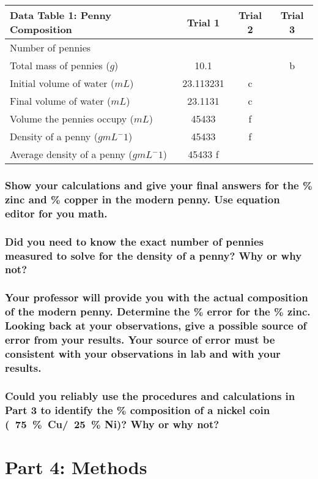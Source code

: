 \documentclass[a4paper,10pt]{article}
\begin{document}
        \begin{table}[h!]
            \label{tab:table1}
            \begin{tabular}{|l|c|c|c|}
                \hline
                \textbf{Data Table 1: Penny Composition} & \textbf{Trial 1} & \textbf{Trial 2} & \textbf{Trial 3}\\
                \hline
                Number of pennies & & & \\
                \hline
                Total mass of pennies ($g$) & 10.1 & & b \\
                \hline
                Initial volume of water ($mL$) & 23.113231 & c & \\
                \hline
                Final volume of water ($mL$) & 23.1131 & c & \\
                \hline
                Volume the pennies occupy ($mL$) & 45433 & f & \\
                \hline
                Density of a penny ($g mL^-1$) & 45433 & f & \\
                \hline
                Average density of a penny ($g mL^-1$) & 45433  f &&\\
                \hline
            \end{tabular}
        \end{table}

        \subsubsection{Show your calculations and give your final answers for the \% zinc and \% copper in the modern penny. Use equation editor for you math.}

        \subsubsection{Did you need to know the exact number of pennies measured to solve for the density of a penny? Why or why not?}

        \subsubsection{Your professor will provide you with the actual composition of the modern penny. Determine the \% error for the \% zinc. Looking back at your observations, give a possible source of error from your results. Your source of error must be consistent with your observations in lab and with your results.}

        \subsubsection{Could you reliably use the procedures and calculations in Part 3 to identify the \% composition of a nickel coin (~75~\%~Cu/~25~\% Ni)? Why or why not?}

    \section{Part 4: Methods}
\end{document}
